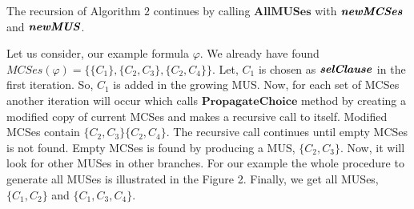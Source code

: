 The recursion of Algorithm $2$ continues by calling $\textbf{AllMUSes}$ with $\textbf{\textit{newMCSes}}$ and $\textbf{\textit{newMUS}}$.
\begin{example}
Let us consider, our example formula $\varphi$. We already have found $MCSes(\varphi)=\{\{C_{1}\}, \{C_{2}, C_{3}\}, \{C_{2}, C_{4}\}\}$. Let, $C_{1}$ is chosen as $\textbf{\textit{selClause}}$ in the first iteration. So, $C_{1}$ is added in the growing MUS. Now, for each set of MCSes another iteration will occur which calls $\textbf{PropagateChoice}$ method by creating a modified copy of current MCSes and makes a recursive call to itself. Modified MCSes contain $\{C_{2}, C_{3}\}\{C_{2},C_{4}\}$. The recursive call continues until empty MCSes is not found. Empty MCSes is found by producing a MUS, $\{C_{2}, C_{3}\}$. Now, it will look for other MUSes in other branches. For our example the whole procedure to generate all MUSes is illustrated in the Figure 2. Finally, we get all MUSes, $\{C_{1}, C_{2}\}$ and $\{C_{1},C_{3}, C_{4}\}$.
\end{example}